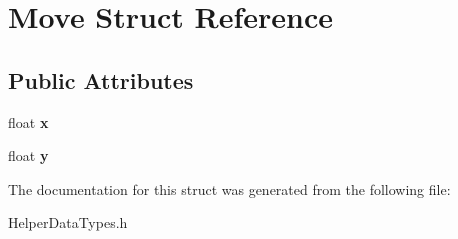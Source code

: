 \hypertarget{struct_move}{}\section{Move Struct Reference}
\label{struct_move}
\subsection*{Public Attributes}
\begin{DoxyCompactItemize}
\item 
\mbox{\label{struct_move_a15a4723eb1501a58104bbffaf71ae297}} 
float {\bfseries x}
\item 
\mbox{\label{struct_move_ad9a7db3b23380854c8859c619e0d64b8}} 
float {\bfseries y}
\end{DoxyCompactItemize}


The documentation for this struct was generated from the following file\+:\begin{DoxyCompactItemize}
\item 
Helper\+Data\+Types.\+h\end{DoxyCompactItemize}
